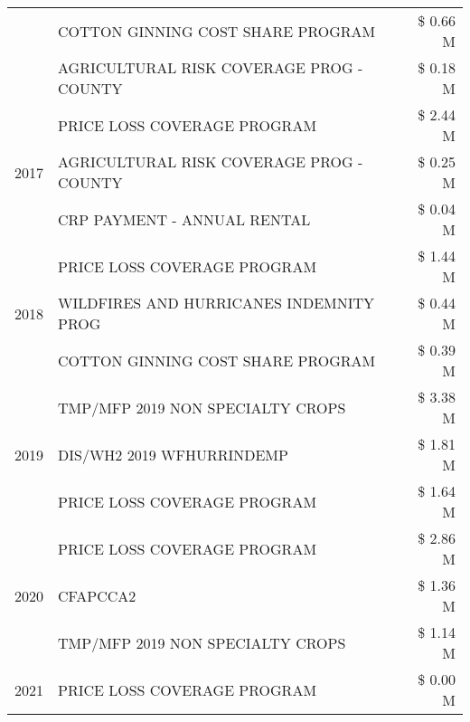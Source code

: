 \begin{tabular}{llr}
 & COTTON GINNING COST SHARE PROGRAM             & \$ 0.66 M \\
 & AGRICULTURAL RISK COVERAGE PROG - COUNTY      & \$ 0.18 M \\
\cline{1-3}
\multirow[t]{3}{*}{2017} & PRICE LOSS COVERAGE PROGRAM & \$ 2.44 M \\
 & AGRICULTURAL RISK COVERAGE PROG - COUNTY & \$ 0.25 M \\
 & CRP PAYMENT - ANNUAL RENTAL & \$ 0.04 M \\
\cline{1-3}
\multirow[t]{3}{*}{2018} & PRICE LOSS COVERAGE PROGRAM & \$ 1.44 M \\
 & WILDFIRES AND HURRICANES INDEMNITY PROG & \$ 0.44 M \\
 & COTTON GINNING COST SHARE PROGRAM & \$ 0.39 M \\
\cline{1-3}
\multirow[t]{3}{*}{2019} & TMP/MFP 2019 NON SPECIALTY CROPS & \$ 3.38 M \\
 & DIS/WH2 2019 WFHURRINDEMP & \$ 1.81 M \\
 & PRICE LOSS COVERAGE PROGRAM & \$ 1.64 M \\
\cline{1-3}
\multirow[t]{3}{*}{2020} & PRICE LOSS COVERAGE PROGRAM & \$ 2.86 M \\
 & CFAPCCA2 & \$ 1.36 M \\
 & TMP/MFP 2019 NON SPECIALTY CROPS & \$ 1.14 M \\
\cline{1-3}
2021 & PRICE LOSS COVERAGE PROGRAM & \$ 0.00 M \\
\cline{1-3}
\bottomrule
\end{tabular}
